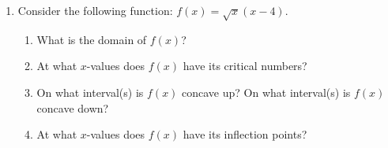 \documentclass[11pt]{article}
\begin{document}
\begin{enumerate}











\item[\textbf{A1.}]
Consider the following function:
$f(x) = \sqrt{x}\left(x - 4\right)$.
\begin{enumerate}
\item
What is the domain of $f(x)$?
\item
At what $x$-values does $f(x)$ have its critical numbers?
\vfill
\item 
On what interval(s) is $f(x)$ concave up? On what interval(s) is $f(x)$ concave down?
\vfill
\item
At what $x$-values does $f(x)$ have its inflection points?
\vfill
\end{enumerate}
\newpage




\end{enumerate}
\end{document}
